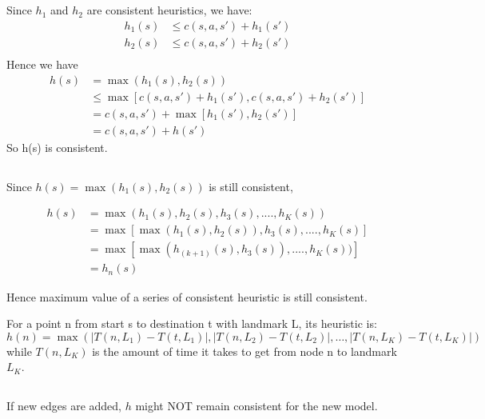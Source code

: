 \documentclass[12pt]{article}
\begin{document}
\subsection{}





Since $h_1$ and $h_2$ are consistent heuristics, we have:
\begin{align*}
h_1(s) & \leq c(s,a,s') + h_1(s') \\
h_2(s) & \leq c(s,a,s') + h_2(s') \\
\end{align*}
Hence we have
\begin{align*}
h(s) & = \max(h_1(s), h_2(s))  \\
 & \leq \max\left[ c(s,a,s') + h_1(s'), c(s,a,s') + h_2(s')\right] \\
& = c(s,a,s') + \max\left[ h_1(s'), h_2(s')\right] \\
& = c(s,a,s') + h(s')
\end{align*}
So h(s) is consistent.

\subsection{}
Since 
$h(s)  = \max(h_1(s), h_2(s))$ is still consistent,

\begin{align*}
h(s) & = \max(h_1(s), h_2(s), h_3(s),....,h_K(s))  \\
 &  =  \max\left[ \max(h_1(s), h_2(s)), h_3(s),....,h_K(s)  \right] \\
 &  =  \max\left[ \max(h_{(k+1)}(s), h_3(s)),....,h_K(s))  \right] \\
& = h_n(s)
\end{align*}

Hence maximum value of a series of consistent heuristic is still consistent.

For a point n from start s to destination t with landmark L, its heuristic is:
\begin{equation}
h(n) = \max(|T(n,L_1) - T(t,L_1)|, |T(n,L_2) - T(t,L_2)|, \ldots ,|T(n,L_K) -
T(t,L_K)|)
\end{equation}
while $T(n,L_K)$ is the amount of time it takes to get from node n to landmark
$L_K$.

\subsection{}

If new edges are added, ${h}$ might NOT remain consistent for the new model. 
\end{document}
